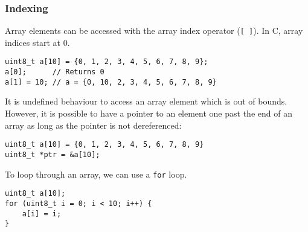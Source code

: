 \documentclass{article}
\begin{document}
\subsubsection{Indexing}
Array elements can be accessed with the array index operator
(\texttt{[ ]}). In C, array indices start at 0.
\begin{verbatim}
uint8_t a[10] = {0, 1, 2, 3, 4, 5, 6, 7, 8, 9};
a[0];      // Returns 0
a[1] = 10; // a = {0, 10, 2, 3, 4, 5, 6, 7, 8, 9}
\end{verbatim}
It is undefined behaviour to access an array element which is out of
bounds. However, it is possible to have a pointer to an element one
past the end of an array as long as the pointer is not dereferenced:
\begin{verbatim}
uint8_t a[10] = {0, 1, 2, 3, 4, 5, 6, 7, 8, 9}
uint8_t *ptr = &a[10];
\end{verbatim}
To loop through an array, we can use a \texttt{for} loop.
\begin{verbatim}
uint8_t a[10];
for (uint8_t i = 0; i < 10; i++) {
    a[i] = i;
}
\end{verbatim}
\end{document}
